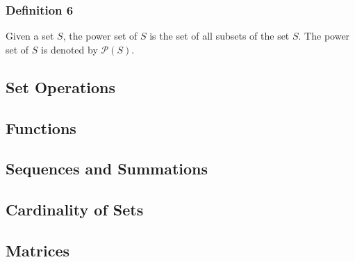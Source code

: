 \documentclass{article}
\begin{document}
\subsubsection{Definition 6}

Given a set $ S $, the power set of $ S $ is the set of all subsets of the set $ S $. The power set of $ S $ is denoted by $ \mathcal{P}(S) $.

\subsection{Set Operations}

\subsection{Functions}

\subsection{Sequences and Summations}

\subsection{Cardinality of Sets}

\subsection{Matrices}
\end{document}
